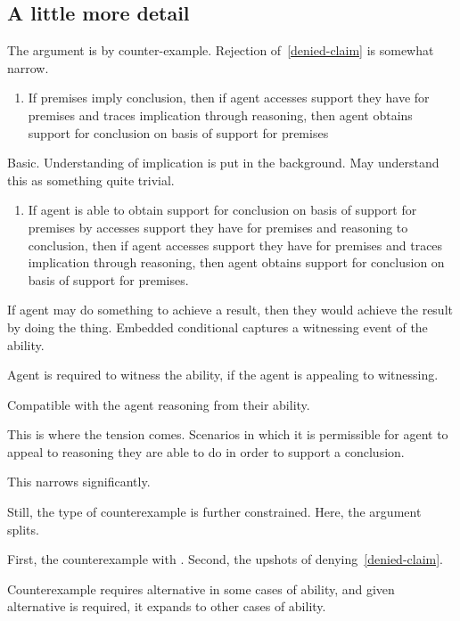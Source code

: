 \documentclass[10pt]{article}
\begin{document}
\subsection{A little more detail}
\label{sec:little-more-detail}

The argument is by counter-example.
Rejection of~\ref{denied-claim} is somewhat narrow.

\begin{enumerate}[]
\item\label{access} If premises imply conclusion, then if agent accesses support they have for premises and traces implication through reasoning, then agent obtains support for conclusion on basis of support for premises
\end{enumerate}

Basic.
Understanding of implication is put in the background.
May understand this as something quite trivial.

\begin{enumerate}[]
\item\label{access} If agent is able to obtain support for conclusion on basis of support for premises by accesses support they have for premises and reasoning to conclusion, then if agent accesses support they have for premises and traces implication through reasoning, then agent obtains support for conclusion on basis of support for premises.
\end{enumerate}

If agent may do something to achieve a result, then they would achieve the result by doing the thing.
Embedded conditional captures a witnessing event of the ability.

Agent is required to witness the ability, if the agent is appealing to witnessing.

Compatible with the agent reasoning from their ability.

This is where the tension comes.
Scenarios in which it is permissible for agent to appeal to reasoning they are able to do in order to support a conclusion.

This narrows significantly.

Still, the type of counterexample is further constrained.
Here, the argument splits.

First, the counterexample with \nI{}.
Second, the upshots of denying~\ref{denied-claim}.

Counterexample requires alternative in some cases of ability, and given alternative is required, it expands to other cases of ability.
\end{document}
